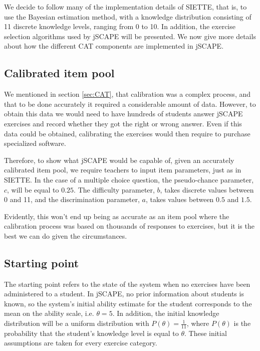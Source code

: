 We decide to follow many of the implementation details of SIETTE, that is, to use the Bayesian estimation method, with a knowledge distribution consisting of 11 discrete knowledge levels, ranging from 0 to 10. In addition, the exercise selection algorithms used by jSCAPE will be presented. We now give more details about how the different CAT components are implemented in jSCAPE.

\subsection{Calibrated item pool}
We mentioned in section \ref{sec:CAT}, that calibration was a complex process, and that to be done accurately it required a considerable amount of data. However,  to obtain this data we would need to have hundreds of students answer jSCAPE exercises and record whether they got the right or wrong answer. Even if this data could be obtained, calibrating the exercises would then require to purchase specialized software. \newline

Therefore, to show what jSCAPE would be capable of, given an accurately calibrated item pool, we require teachers to input item parameters, just as in SIETTE. In the case of a multiple choice question, the pseudo-chance parameter, $c$, will be equal to $0.25$. The difficulty parameter, $b$, takes discrete values between 0 and 11, and the discrimination parameter, $a$, takes values between $0.5$ and $1.5$. \newline

Evidently, this won't end up being as accurate as an item pool where the calibration process was based on thousands of responses to exercises, but it is the best we can do given the circumstances.

\subsection{Starting point}
The starting point refers to the state of the system when no exercises have been administered to a student. In jSCAPE, no prior information about students is known, so the system's initial ability estimate for the student corresponds to the mean on the ability scale, i.e. $\theta = 5$. In addition, the initial knowledge distribution will be a uniform distribution with $P(\theta)=\frac{1}{11}$, where $P(\theta)$ is the probability that the student's knowledge level is equal to $\theta$. These initial assumptions are taken for every exercise category.

